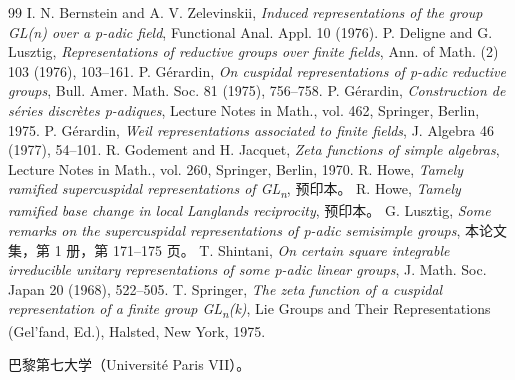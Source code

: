 \begin{thebibliography}{99}
 I. N. Bernstein and A. V. Zelevinskii, \emph{Induced representations of the group GL(n) over a p-adic field}, Functional Anal. Appl. 10 (1976).
 P. Deligne and G. Lusztig, \emph{Representations of reductive groups over finite fields}, Ann. of Math. (2) 103 (1976), 103--161.
 P. Gérardin, \emph{On cuspidal representations of p-adic reductive groups}, Bull. Amer. Math. Soc. 81 (1975), 756--758.
 P. Gérardin, \emph{Construction de séries discrètes p-adiques}, Lecture Notes in Math., vol. 462, Springer, Berlin, 1975.
 P. Gérardin, \emph{Weil representations associated to finite fields}, J. Algebra 46 (1977), 54--101.
 R. Godement and H. Jacquet, \emph{Zeta functions of simple algebras}, Lecture Notes in Math., vol. 260, Springer, Berlin, 1970.
 R. Howe, \emph{Tamely ramified supercuspidal representations of GL\textsubscript{n}}, 预印本。
 R. Howe, \emph{Tamely ramified base change in local Langlands reciprocity}, 预印本。
 G. Lusztig, \emph{Some remarks on the supercuspidal representations of p-adic semisimple groups}, 本论文集，第 1 册，第 171--175 页。
 T. Shintani, \emph{On certain square integrable irreducible unitary representations of some p-adic linear groups}, J. Math. Soc. Japan 20 (1968), 522--505.
 T. Springer, \emph{The zeta function of a cuspidal representation of a finite group GL\textsubscript{n}(k)}, Lie Groups and Their Representations (Gel'fand, Ed.), Halsted, New York, 1975.
\end{thebibliography}
\par\noindent 巴黎第七大学（Université Paris VII）。
